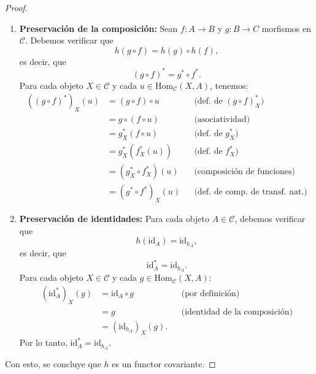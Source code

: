 \begin{proof}
\begin{enumerate}
 		\item \textbf{Preservación de la composición:}
 		Sean $f: A \to B$ y $g: B \to C$ morfismos en $\mathcal{C}$. Debemos verificar que
 		\[
 		h(g \circ f) = h(g) \circ h(f),
 		\]
 		es decir, que
 		\[
 		(g \circ f)^\ast = g^\ast \circ f^\ast.
 		\]
 		Para cada objeto $X \in \mathcal{C}$ y cada $u \in \mathrm{Hom}_{\mathcal{C}}(X, A)$, tenemos:
 		\begin{align*}
 			((g \circ f)^\ast)_X(u) &= (g \circ f) \circ u && \text{(def. de } (g \circ f)^\ast_X) \\
 			&= g \circ (f \circ u) && \text{(asociatividad)} \\
 			&= g^\ast_X(f \circ u) && \text{(def. de } g^\ast_X) \\
 			&= g^\ast_X(f^\ast_X(u)) && \text{(def. de } f^\ast_X) \\
 			&= (g^\ast_X \circ f^\ast_X)(u) && \text{(composición de funciones)} \\
 			&= (g^\ast \circ f^\ast)_X(u) && \text{(def. de comp. de transf. nat.)}
 		\end{align*}
 		
 		\item \textbf{Preservación de identidades:}
 		Para cada objeto $A \in \mathcal{C}$, debemos verificar que
 		\[
 		h(\mathrm{id}_A) = \mathrm{id}_{h_A},
 		\]
 		es decir, que
 		\[
 		\mathrm{id}_A^\ast = \mathrm{id}_{h_A}.
 		\]
 		Para cada objeto $X \in \mathcal{C}$ y cada $g \in \mathrm{Hom}_{\mathcal{C}}(X, A)$:
 		\begin{align*}
 			(\mathrm{id}_A^\ast)_X(g) &= \mathrm{id}_A \circ g && \text{(por definición)} \\
 			&= g && \text{(identidad de la composición)} \\
 			&= (\mathrm{id}_{h_A})_X(g).
 		\end{align*}
 		Por lo tanto, $\mathrm{id}_A^\ast = \mathrm{id}_{h_A}$.
 		
 	\end{enumerate}
 	
 	Con esto, se concluye que \( h \) es un functor covariante.
 	
 
 \end{proof}
 
 
\begin{observacion}
\end{observacion}

